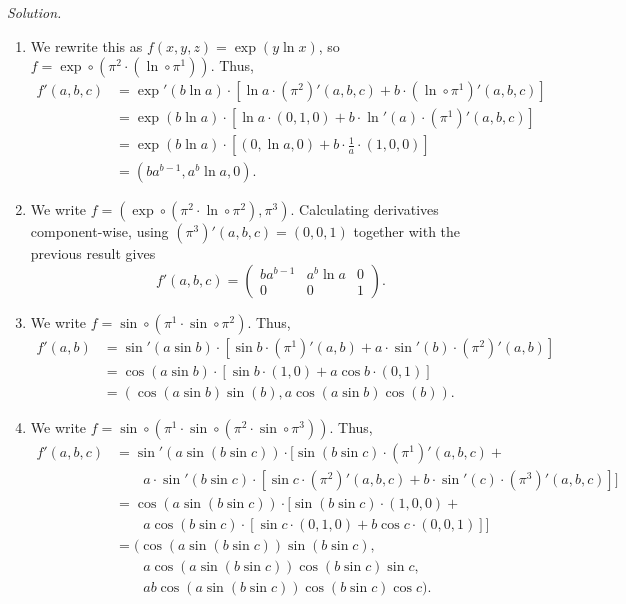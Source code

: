 \documentclass[11pt]{report}
\newcommand{\solution}{\noindent\textit{Solution.} }
\begin{document}
    \solution \begin{enumerate}
        \item We rewrite this as $f(x, y, z) = \exp(y\ln{x})$, so $f = \exp \circ
        (\pi^2 \cdot (\ln \circ \pi^1))$. Thus, \begin{align*}
            f'(a, b, c) &= \exp'(b\ln{a})\cdot [\ln{a}\cdot (\pi^2)'(a, b, c) +
            b\cdot (\ln \circ \pi^1)'(a, b, c)] \\
            &= \exp(b\ln{a})\cdot [\ln{a}\cdot (0, 1, 0) + b\cdot \ln'(a)\cdot
            (\pi^1)'(a, b, c)] \\
            &= \exp(b\ln{a})\cdot [(0, \ln{a}, 0) + b\cdot \frac{1}{a}\cdot (1, 0,
            0)] \\
            &= (ba^{b - 1}, a^b\ln{a}, 0).
        \end{align*}

        \item We write $f = (\exp\circ (\pi^2\cdot \ln \circ \pi^2), \pi^3)$.
        Calculating derivatives component-wise, using $(\pi^3)'(a, b, c) = (0, 0,
        1)$ together with the previous result gives \[
            f'(a, b, c) = \begin{pmatrix}
                ba^{b - 1} & a^b\ln{a} & 0 \\
                0 & 0 & 1
            \end{pmatrix}.
        \] 

        \item We write $f = \sin\circ (\pi^1 \cdot \sin \circ \pi^2)$. Thus,
        \begin{align*}
            f'(a, b) &= \sin'(a\sin{b}) \cdot [\sin{b}\cdot (\pi^1)'(a, b) +
            a\cdot \sin'(b)\cdot (\pi^2)'(a, b)] \\
            &= \cos(a\sin{b}) \cdot [\sin{b}\cdot (1, 0) + a\cos{b}\cdot(0, 1)]
            \\
            &= (\cos(a\sin{b})\sin(b), a\cos(a\sin{b})\cos(b)).
        \end{align*}
        
        \item We write $f = \sin\circ (\pi^1 \cdot \sin \circ (\pi^2 \cdot \sin\circ
        \pi^3))$. Thus,
        \begin{align*}
            f'(a, b, c) &= \sin'(a\sin(b\sin{c})) \cdot [\sin(b\sin{c})\cdot
            (\pi^1)'(a, b, c) + \\ &\qquad a\cdot \sin'(b\sin{c})\cdot
            [\sin{c}\cdot(\pi^2)'(a, b, c) + b\cdot \sin'(c)\cdot (\pi^3)'(a, b, c)]]
            \\
            &= \cos(a\sin(b\sin{c})) \cdot [\sin(b\sin{c})\cdot(1, 0, 0) +
            \\ &\qquad a\cos(b\sin{c}) \cdot[\sin{c}\cdot(0, 1, 0) + b\cos{c}\cdot
            (0, 0, 1)]] \\
            &= (\cos(a\sin(b\sin{c})) \sin(b\sin{c}), \\
            & \qquad a\cos(a\sin(b\sin{c}))\cos(b\sin{c})\sin{c}, \\
            & \qquad ab\cos(a\sin(b\sin{c}))\cos(b\sin{c})\cos{c}).
        \end{align*}


\end{enumerate}
\end{document}
